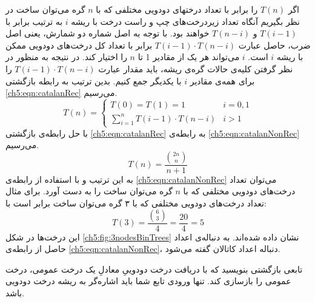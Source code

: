  اگر {$T(n)$} را برابر با تعداد درختهای دودویی مختلفی که با {$n$} گره می‌توان ساخت در نظر بگیریم آنگاه تعداد زیردرخت‌های چپ و راست درخت با ریشه {$i$} به ترتیب برابر با {$T(i-1)$} و {$T(n-i)$} خواهند بود. با توجه به اصل شماره دو شمارش، یعنی اصل ضرب، حاصل عبارت {$T(i-1)\cdot T(n-i)$} برابر با تعداد کل درخت‌های دودویی ممکن با ریشه {$i$} است. {$i$} می‌تواند هر یک از مقادیر 1 تا {$n$} را اختیار کند. در نتیجه به ‌منظور در نظر گرفتن کلیه‌ی حالات گره‌ی ریشه، باید  مقدار عبارت {$T(i-1)\cdot T(n-i)$} را برای همه‌ی مقادیر {$i$} با یکدیگر جمع کنیم. بدین ترتیب به رابطه بازگشتی {\eqref{ch5:eqn:catalanRec}} می‌رسیم.
 \begin{equation}
 T(n)=
 \begin{cases}
 T(0)=T(1)=1 & i=0,1\\
 \sum\limits_{i=1}^{n}{T(i-1)\cdot T(n-i)}& i > 1
 \end{cases}\label{ch5:eqn:catalanRec}
 \end{equation}
با حل رابطه‌ی بازگشتی {\eqref{ch5:eqn:catalanRec}} به رابطه‌ی  {\eqref{ch5:eqn:catalanNonRec}} می‌رسیم.
 \begin{equation}
T(n)=\frac{\displaystyle\binom{2n}{n}}{n+1}\label{ch5:eqn:catalanNonRec}
 \end{equation}
به این ترتیب و با استفاده از رابطه‌ی {\eqref{ch5:eqn:catalanNonRec}} می‌توان تعداد درخت‌های دودویی مختلفی که با {$n$} گره می‌توان ساخت را به دست آورد. برای مثال تعداد درخت‌های دودویی مختلفی که با ۳ گره می‌توان ساخت برابر است با:
\begin{displaymath}
T(3)=\frac{\displaystyle\binom{6}{3}}{4}=\frac{20}{4}=5
\end{displaymath}
این درخت‌ها در شکل {\eqref{ch5:fig:3nodesBinTrees}} نشان داده شده‌اند. به دنباله‌ی اعداد حاصل از رابطه‌ی {\eqref{ch5:eqn:catalanNonRec}}، دنباله اعداد کاتالان گفته می‌شود.

 
  تابعی بازگشتی بنویسید که با دریافت درخت دودوییِ معادلِ یک درخت عمومی، درخت عمومی را بازسازی کند. تنها ورودی تابع شما باید اشاره‌گر به ریشه درخت دودویی باشد.


